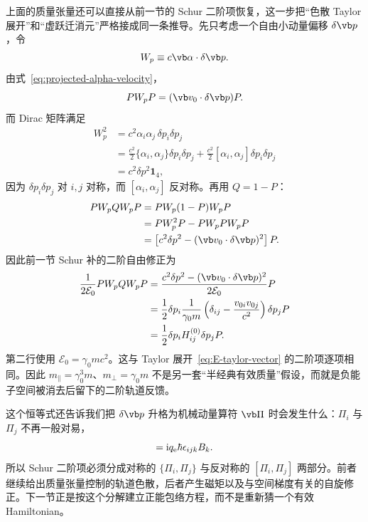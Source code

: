 上面的质量张量还可以直接从前一节的 Schur 二阶项恢复，这一步把“色散 Taylor 展开”和“虚跃迁消元”严格接成同一条推导。先只考虑一个自由小动量偏移 $\delta\vb p$，令
\begin{equation}
W_p\equiv c\vb\alpha\cdot\delta\vb p.
\end{equation}
由式~\cref{eq:projected-alpha-velocity}，
\begin{equation}
PW_pP=(\vb v_0\cdot\delta\vb p)P.
\end{equation}
而 Dirac 矩阵满足
\begin{align}
W_p^2
&=c^2\alpha_i\alpha_j\,\delta p_i\delta p_j\\
&=\frac{c^2}{2}\{\alpha_i,\alpha_j\}\delta p_i\delta p_j
 +\frac{c^2}{2}[\alpha_i,\alpha_j]\delta p_i\delta p_j\\
&=c^2\delta p^2\mathbf 1_4,
\end{align}
因为 $\delta p_i\delta p_j$ 对 $i,j$ 对称，而 $[\alpha_i,\alpha_j]$ 反对称。再用 $Q=1-P$：
\begin{align}
PW_pQW_pP
&=PW_p(1-P)W_pP\\
&=PW_p^2P-PW_pPW_pP\\
&=\left[c^2\delta p^2-(\vb v_0\cdot\delta\vb p)^2\right]P.
\end{align}
因此前一节 Schur 补的二阶自由修正为
\begin{align}
\frac{1}{2\mathcal E_0}PW_pQW_pP
&=\frac{c^2\delta p^2-(\vb v_0\cdot\delta\vb p)^2}{2\mathcal E_0}P\\
&=\frac12\delta p_i
\frac{1}{\gamma_0m}
\left(\delta_{ij}-\frac{v_{0i}v_{0j}}{c^2}\right)
\delta p_j P\\
&=\frac12\delta p_iH_{ij}^{(0)}\delta p_jP.
\label{eq:schur-hessian-identity}
\end{align}
第二行使用 $\mathcal E_0=\gamma_0mc^2$。这与 Taylor 展开~\cref{eq:E-taylor-vector} 的二阶项逐项相同。因此 $m_\parallel=\gamma_0^3m$、$m_\perp=\gamma_0m$ 不是另一套“半经典有效质量”假设，而就是负能子空间被消去后留下的二阶轨道反馈。

这个恒等式还告诉我们把 $\delta\vb p$ 升格为机械动量算符 $\vb\Pi$ 时会发生什么：$\Pi_i$ 与 $\Pi_j$ 不再一般对易，
\begin{equation}
[\Pi_i,\Pi_j]
=\ii q_{\rm e}\hbar\epsilon_{ijk}B_k.
\label{eq:Pi-commutator-B}
\end{equation}
所以 Schur 二阶项必须分成对称的 $\{\Pi_i,\Pi_j\}$ 与反对称的 $[\Pi_i,\Pi_j]$ 两部分。前者继续给出质量张量控制的轨道色散，后者产生磁矩以及与空间梯度有关的自旋修正。下一节正是按这个分解建立正能包络方程，而不是重新猜一个有效 Hamiltonian。


